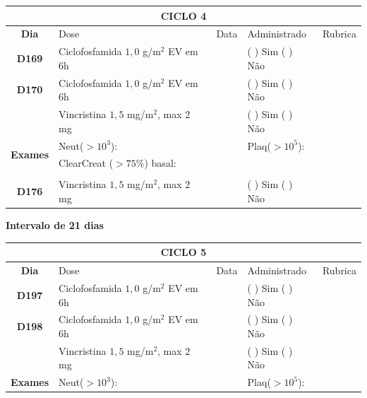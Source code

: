 \documentclass[11pt,a4paper,oldfontcommands]{memoir}
\begin{document}
\begin{center}
\begin{table}[H]
\begin{tabular}{p{1cm}p{6cm}|p{1cm}|p{3cm}|p{2.5cm}}
    \hline
	\multicolumn{5}{c}{\textbf{CICLO 4}}\\
	\hline
    \multicolumn{1}{c|}{\multirow{1}{*}{\textbf{Dia}}}&{Dose}&{Data}&{Administrado}&{Rubrica} \\
    \hline
    \multicolumn{1}{c|}{\multirow{1}{*}{\textbf{D169}}}&{Ciclofosfamida \(1,0\) g/m\(^2\) EV em 6h}&&{(  ) Sim (  ) Não}&\\
    \multicolumn{1}{c|}{\multirow{1}{*}{\textbf{D170}}}&{Ciclofosfamida \(1,0\) g/m\(^2\) EV em 6h}&&{(  ) Sim (  ) Não}&\\
    \multicolumn{1}{c|}{\multirow{1}{*}{\textbf{}}}&{Vincristina \(1,5\) mg/m\(^2\), max \(2\) mg}&&{(  ) Sim (  ) Não}&\\
    \hline
    \multicolumn{1}{c|}{\multirow{2}{*}{\textbf{Exames}}}&\multicolumn{2}{l|}{Neut(\(>10^3\)):}&{Plaq(\(>10^5\)):}&\\
    \cline{2-5}
    \multicolumn{1}{c|}{\multirow{2}{*}{{}}}&\multicolumn{2}{l|}{ClearCreat (\(>75\%\)) basal:}&{}&{}\\
    \hline\\
    \hline
    \multicolumn{1}{c|}{\multirow{1}{*}{\textbf{D176}}}&{Vincristina \(1,5\) mg/m\(^2\), max \(2\) mg}&&{(  ) Sim (  ) Não}&\\
    \hline
\end{tabular}
\end{table}
\textbf{Intervalo de 21 dias}
\begin{table}[H]
\begin{tabular}{p{1cm}p{6cm}|p{1cm}|p{3cm}|p{2.5cm}}
    \hline
	\multicolumn{5}{c}{\textbf{CICLO 5}}\\
	\hline
    \multicolumn{1}{c|}{\multirow{1}{*}{\textbf{Dia}}}&{Dose}&{Data}&{Administrado}&{Rubrica} \\
    \hline
    \multicolumn{1}{c|}{\multirow{1}{*}{\textbf{D197}}}&{Ciclofosfamida \(1,0\) g/m\(^2\) EV em 6h}&&{(  ) Sim (  ) Não}&\\
    \multicolumn{1}{c|}{\multirow{1}{*}{\textbf{D198}}}&{Ciclofosfamida \(1,0\) g/m\(^2\) EV em 6h}&&{(  ) Sim (  ) Não}&\\
    \multicolumn{1}{c|}{\multirow{1}{*}{\textbf{}}}&{Vincristina \(1,5\) mg/m\(^2\), max \(2\) mg}&&{(  ) Sim (  ) Não}&\\
    \hline
    \multicolumn{1}{c|}{\multirow{2}{*}{\textbf{Exames}}}&\multicolumn{2}{l|}{Neut(\(>10^3\)):}&{Plaq(\(>10^5\)):}&\\

\end{tabular}
\end{table}
\end{center}
\end{document}
